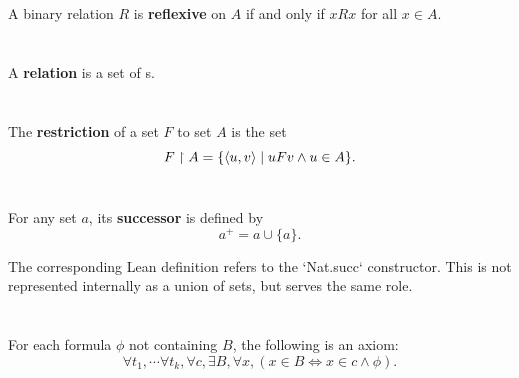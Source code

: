 \documentclass{report}
\begin{document}
  A binary relation $R$ is \textbf{reflexive} on $A$ if and only if $xRx$ for
    all $x \in A$.



\section{}%

  A \textbf{relation} is a set of s.



\section{}%

  The \textbf{restriction} of a set $F$ to set $A$ is the set
    $$F \restriction A = \{\left< u, v \right> \mid uFv \land u \in A\}.$$


\section{}%

  For any set $a$, its \textbf{successor} is defined by $$a^+ = a \cup \{a\}.$$


  \begin{note}
    The corresponding Lean definition refers to the `Nat.succ` constructor.
    This is not represented internally as a union of sets, but serves the same
      role.
  \end{note}

\section{}%

  For each formula $\phi$ not containing $B$, the following is an axiom:
    $$\forall t_1, \cdots \forall t_k, \forall c,
        \exists B, \forall x, (x \in B \iff x \in c \land \phi).$$
\end{document}
